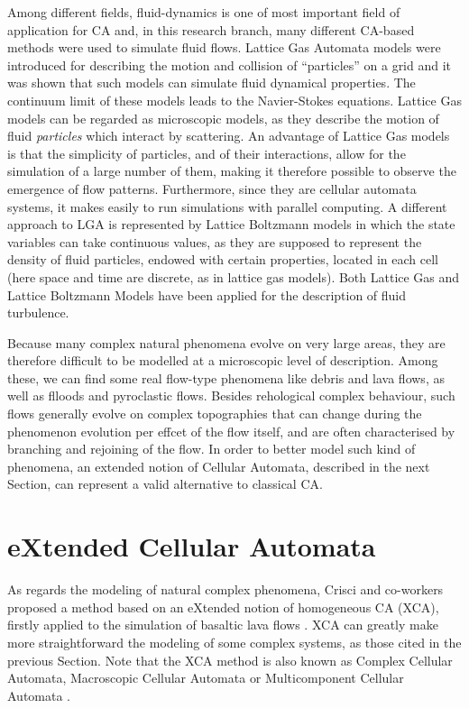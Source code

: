 Among different fields, fluid-dynamics is one of most important field
of application for CA and, in this research branch, many different
CA-based methods were used to simulate fluid flows. Lattice Gas
Automata models were introduced for describing the motion and
collision of “particles” on a grid and it was shown that such models
can simulate fluid dynamical properties. The continuum limit of these
models leads to the Navier-Stokes equations. Lattice Gas models can be
regarded as microscopic models, as they describe the motion of fluid
\emph{particles} which interact by scattering. An advantage of Lattice
Gas models is that the simplicity of particles, and of their
interactions, allow for the simulation of a large number of them,
making it therefore possible to observe the emergence of flow
patterns. Furthermore, since they are cellular automata systems, it
makes easily to run simulations with parallel computing. A different
approach to LGA is represented by Lattice Boltzmann models in which
the state variables can take continuous values, as they are supposed
to represent the density of fluid particles, endowed with certain
properties, located in each cell (here space and time are discrete, as
in lattice gas models). Both Lattice Gas and Lattice Boltzmann Models
have been applied for the description of fluid turbulence.

Because many complex natural phenomena evolve on very large areas,
they are therefore difficult to be modelled at a microscopic level of
description. Among these, we can find some real flow-type phenomena
like debris and lava flows, as well as flloods and pyroclastic
flows. Besides rehological complex behaviour, such flows generally
evolve on complex topographies that can change during the phenomenon
evolution per effcet of the flow itself, and are often characterised
by branching and rejoining of the flow. In order to better model such
kind of phenomena, an extended notion of Cellular Automata, described
in the next Section, can represent a valid alternative to classical
CA.

\section{eXtended Cellular Automata}

As regards the modeling of natural complex phenomena, Crisci and
co-workers proposed a method based on an eXtended notion of
homogeneous CA (XCA), firstly applied to the simulation of basaltic
lava flows \cite{Crisci1982}. XCA can greatly make more
straightforward the modeling of some complex systems, as those cited
in the previous Section. Note that the XCA method is also known as
Complex Cellular Automata, Macroscopic Cellular Automata
\cite{Spataro2010} or Multicomponent Cellular Automata
\cite{Avolio2012}.


